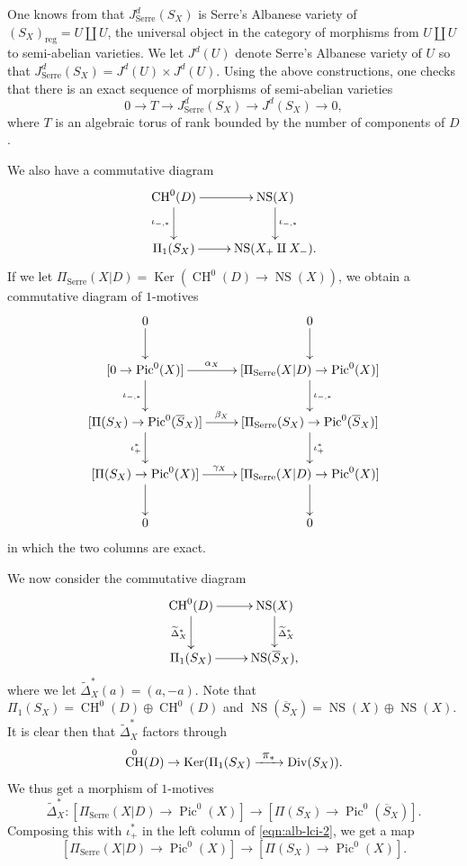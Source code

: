 \documentclass[11pt]{article}
\numberwithin{equation}{section}
\let\ra\rightarrow
\def\To#1{\mathchoice{\xrightarrow{\textstyle\kern4pt#1\kern3pt}}{\stackrel{#1}{\longrightarrow}}{}{}}
\newcommand{\Serre}{\mathrm{Serre}}
\theoremstyle{definition}
\DeclareMathOperator{\CH}{CH}
\DeclareMathOperator{\Div}{Div}
\DeclareMathOperator{\Ker}{Ker}
\DeclareMathOperator{\NS}{NS}
\DeclareMathOperator{\Pic}{Pic}
\newcommand{\reg}{\mathrm{reg}}
\let\ov\overline
\let\wt\widetilde
\begin{document}
One knows from \cite{Serre}
that $J^{d}_{\Serre}(S_X)$ is Serre's Albanese variety of
$(S_X)_{\reg} = U \amalg U$, the universal object in the category
of morphisms from $U \amalg U$ to semi-abelian varieties.
We let $J^d(U)$ denote Serre's Albanese variety of $U$ so that
\hbox{$J^{d}_{\Serre}(S_X)\!=\!J^d(U)\!\times\!J^d(U)$}.
Using the above constructions, one checks that there is an exact sequence of
morphisms of semi-abelian varieties
\begin{equation}\label{eqn:alb-lci-0}
0 \to T \to J^d_{\Serre}(S_X) \to J^d(S_X) \to 0,
\end{equation}
where $T$ is an algebraic torus of rank bounded by
the number of components of $D$.

We also have a commutative diagram
\begin{equation}\label{eqn:alb-lci-1}
\begin{array}{c}
\xymatrix{
\CH^0(D) \ar[d]_{\iota_{-, *}} \ar[r] & \NS(X) \ar[d]^{\iota_{-,*}} \\
\Pi_1(S_X) \ar[r] & \NS(X_+ \amalg X_-).}
\end{array}
\end{equation}
If we let
$\Pi_{\Serre}(X|D) = \Ker(\CH^0(D) \to \NS(X))$,
we obtain a commutative diagram of $1$-motives
\begin{equation}\label{eqn:alb-lci-2}
\begin{array}{c}
\xymatrix{
0 \ar[d] & 0 \ar[d] \\
[0 \to \Pic^0(X)] \ar[r]^-{\alpha_X} \ar[d]_{\iota_{-,*}} &
[\Pi_{\Serre}(X|D) \to \Pic^0(X)] \ar[d]^{\iota_{-,*}} \\
[\Pi(S_X) \to \Pic^0(\ov{S}_X)] \ar[r]^-{\beta_X} \ar[d]_{\iota^*_{+}} &
[\Pi_{\Serre}(S_X) \to \Pic^0(\ov{S}_X)] \ar[d]^{\iota^*_+} \\
[\Pi(S_X) \to \Pic^0(X)] \ar[r]^-{\gamma_X} \ar[d] &
[\Pi_{\Serre}(X|D) \to \Pic^0(X)] \ar[d] \\
0 & 0}
\end{array}
\end{equation}
in which the two columns are exact.

We now consider the commutative diagram
\begin{equation}\label{eqn:alb-lci-4}
\begin{array}{c}
\xymatrix{
\CH^0(D) \ar[r] \ar[d]_{\wt{\Delta}^*_X} & \NS(X) \ar[d]^{\wt{\Delta}^*_X} \\
\Pi_1(S_X) \ar[r] & \NS(\ov{S}_X),}
\end{array}
\end{equation}
where we let $\wt{\Delta}^*_X(a) = (a, -a)$. Note that
$\Pi_1(S_X) = \CH^0(D) \oplus \CH^0(D)$ and
$\NS(\ov{S}_X) = \NS(X) \oplus \NS(X)$.
It is clear then that $\wt{\Delta}^*_X$ factors through
\[
\CH^0(D) \to
\Ker(\Pi_1(S_X) \To{\pi_*} \Div(S_X)).
\]
We thus get a morphism of $1$-motives
\[
\wt{\Delta}^*_X:[\Pi_{\Serre}(X|D) \ra \Pic^0(X)]
\to [\Pi(S_X) \ra \Pic^0(\ov{S}_X)].
\]
Composing this with $\iota^*_+$ in the left column of \eqref{eqn:alb-lci-2},
we get a map
\[
[\Pi_{\Serre}(X|D) \ra \Pic^0(X)] \to
[\Pi(S_X) \ra \Pic^0(X)].
\]
\end{document}
